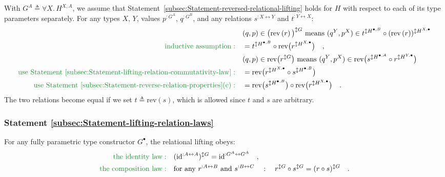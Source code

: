 With $G^{A}\triangleq\forall X.\,H^{X,A}$, we assume that Statement~\ref{subsec:Statement-reversed-relational-lifting}
holds for $H$ with respect to each of its type parameters separately.
For any types $X$, $Y$, values $p^{:G^{A}}$, $q^{:G^{B}}$, and
any relations $s^{:X\leftrightarrow Y}$ and $t^{:Y\leftrightarrow X}$:
\begin{align*}
 & (q,p)\in\big(\text{rev}\left(r\right)\big)^{\updownarrow G}\text{ means }(q^{Y},p^{X})\in t^{\updownarrow H^{\bullet,B}}\circ(\text{rev}\left(r\right))^{\updownarrow H^{X,\bullet}}\\
{\color{greenunder}\text{inductive assumption}:}\quad & =t^{\updownarrow H^{\bullet,B}}\circ\text{rev}\big(r^{\updownarrow H^{X,\bullet}}\big)\quad,\\
 & (q,p)\in\text{rev}\big(r^{\updownarrow G}\big)\text{ means }(q^{Y},p^{X})\in\text{rev}\big(s^{\updownarrow H^{\bullet,A}}\circ r^{\updownarrow H^{Y,\bullet}}\big)\\
{\color{greenunder}\text{use Statement~\ref{subsec:Statement-lifting-relation-commutativity-law}}:}\quad & =\text{rev}\big(r^{\updownarrow H^{X,\bullet}}\circ s^{\updownarrow H^{\bullet,B}}\big)\\
{\color{greenunder}\text{use Statement~\ref{subsec:Statement-reverse-relation-properties}(c)}:}\quad & =\text{rev}\big(s^{\updownarrow H^{\bullet,B}}\big)\circ\text{rev}\big(r^{\updownarrow H^{X,\bullet}}\big)\quad.
\end{align*}
The two relations become equal if we set $t\triangleq\text{rev}\left(s\right)$,
which is allowed since $t$ and $s$ are arbitrary.

\subsubsection{Statement \label{subsec:Statement-lifting-relation-laws}\ref{subsec:Statement-lifting-relation-laws}}

For any fully parametric type constructor $G^{\bullet}$, the relational
lifting obeys:
\begin{align*}
{\color{greenunder}\text{the identity law}:}\quad & (\text{id}^{:A\leftrightarrow A})^{\updownarrow G}=\text{id}^{:G^{A}\leftrightarrow G^{A}}\quad,\\
{\color{greenunder}\text{the composition law}:}\quad & \text{for any }r^{:A\leftrightarrow B}\text{ and }s^{:B\leftrightarrow C}\quad:\quad r^{\updownarrow G}\circ s^{\updownarrow G}=(r\circ s)^{\updownarrow G}\quad.
\end{align*}


